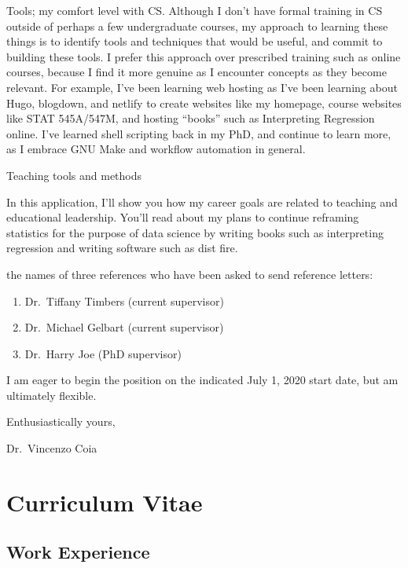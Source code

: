 \documentclass[]{article}
\providecommand{\tightlist}{%
  \setlength{\itemsep}{0pt}\setlength{\parskip}{0pt}}
\begin{document}
Tools; my comfort level with CS. Although I don't have formal training in CS outside of perhaps a few undergraduate courses, my approach to learning these things is to identify tools and techniques that would be useful, and commit to building these tools. I prefer this approach over prescribed training such as online courses, because I find it more genuine as I encounter concepts as they become relevant. For example, I've been learning web hosting as I've been learning about Hugo, blogdown, and netlify to create websites like my homepage, course websites like STAT 545A/547M, and hosting ``books'' such as Interpreting Regression online. I've learned shell scripting back in my PhD, and continue to learn more, as I embrace GNU Make and workflow automation in general.

Teaching tools and methods

In this application, I'll show you how my career goals are related to teaching and educational leadership. You'll read about my plans to continue reframing statistics for the purpose of data science by writing books such as interpreting regression and writing software such as dist fire.

the names of three references who have been asked to send reference letters:

\begin{enumerate}
\def\labelenumi{\arabic{enumi}.}
\tightlist
\item
  Dr.~Tiffany Timbers (current supervisor)
\item
  Dr.~Michael Gelbart (current supervisor)
\item
  Dr.~Harry Joe (PhD supervisor)
\end{enumerate}

I am eager to begin the position on the indicated July 1, 2020 start date, but am ultimately flexible.

Enthusiastically yours,

Dr.~Vincenzo Coia

\hypertarget{curriculum-vitae}{%
\section{Curriculum Vitae}\label{curriculum-vitae}}

\hypertarget{work-experience}{%
\subsection{Work Experience}\label{work-experience}}
\end{document}
